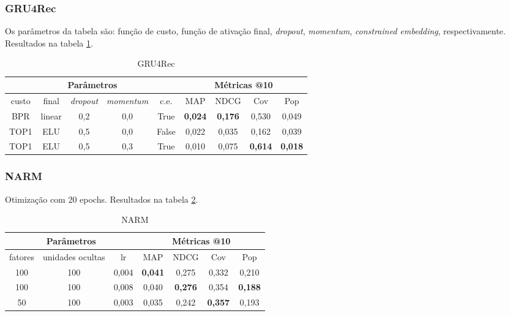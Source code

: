 \subsubsection{GRU4Rec}

Os parâmetros da tabela são: função de custo, função de ativação final,
\textit{dropout}, \textit{momentum}, \textit{constrained embedding}, respectivamente.
Resultados na tabela \ref{opt:GRU4Rec_rem}.

\begin{table}[htbp]
  \centering
  \begin{tabular}{|c|c|c|c|c|c|c|c|c|}
    \hline
      \multicolumn{5}{|c|}{Parâmetros} & \multicolumn{4}{c|}{Métricas @10} \\
      \hline
      custo & final & \textit{dropout} & \textit{momentum} & c.e. & MAP & NDCG & Cov & Pop \\
      \hline
      BPR & linear & 0,2 & 0,0 & True & \textbf{0,024} & \textbf{0,176} & 0,530 & 0,049 \\
      \hline
      TOP1 & ELU & 0,5 & 0,0 & False & 0,022 & 0,035 & 0,162 & 0,039 \\
      \hline
      TOP1 & ELU & 0,5 & 0,3 & True & 0,010 & 0,075 & \textbf{0,614} & \textbf{0,018} \\
      \hline
\end{tabular}
      \caption{GRU4Rec}
      \label{opt:GRU4Rec_rem}
\end{table}

\subsubsection{NARM}
Otimização com 20 epochs. Resultados na tabela \ref{opt:NARM_rem}.

\begin{table}[htbp]
  \centering
  \begin{tabular}{|c|c|c|c|c|c|c|}
    \hline
      \multicolumn{3}{|c|}{Parâmetros} & \multicolumn{4}{c|}{Métricas @10} \\
      \hline
      fatores & unidades ocultas & lr & MAP & NDCG & Cov & Pop \\
      \hline
      100 & 100 & 0,004 & \textbf{0,041} & 0,275 & 0,332 & 0,210 \\
      \hline
      100 & 100 & 0,008 & 0,040 & \textbf{0,276} & 0,354 & \textbf{0,188} \\
      \hline
      50 & 100 & 0,003 & 0,035 & 0,242 & \textbf{0,357} & 0,193 \\
      \hline
\end{tabular}
      \caption{NARM}
      \label{opt:NARM_rem}
\end{table}

